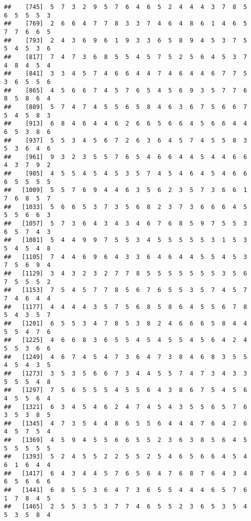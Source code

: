 \documentclass[
]{book}
\begin{document}
\begin{verbatim}
##    [745]  5  7  3  2  9  5  7  6  4  6  5  2  4  4  4  3  7  8  5  6  5  5  5  3
##    [769]  2  6  6  4  7  7  8  3  3  7  4  6  4  8  6  1  4  6  5  7  7  6  6  5
##    [793]  2  4  3  6  9  6  1  9  3  3  6  5  8  9  4  5  3  7  5  5  4  5  3  6
##    [817]  7  4  7  3  6  8  5  5  4  5  7  5  2  5  6  4  5  3  7  4  8  4  5  4
##    [841]  3  3  4  5  7  4  6  6  4  4  7  4  6  4  4  6  7  7  5  3  6  5  5  6
##    [865]  4  5  6  6  7  4  5  7  6  5  4  5  6  9  3  5  7  7  6  8  5  8  6  4
##    [889]  5  7  4  7  4  5  5  6  5  8  4  6  3  6  7  5  6  6  7  5  4  5  8  3
##    [913]  6  8  4  6  4  4  6  2  6  6  5  6  6  4  5  6  6  4  4  6  5  3  8  6
##    [937]  5  5  3  4  5  6  7  2  6  3  6  4  5  7  4  5  5  8  3  5  3  6  4  6
##    [961]  9  3  2  3  5  5  7  6  5  4  6  6  4  4  5  4  4  6  6  4  3  7  9  2
##    [985]  4  5  5  4  5  4  5  3  5  7  4  5  4  6  4  5  4  6  6  6  5  5  5  5
##   [1009]  5  5  7  6  9  4  4  6  3  5  6  2  3  5  7  3  6  6  1  7  6  8  5  7
##   [1033]  5  6  6  5  3  7  3  5  6  8  2  3  7  3  6  6  6  4  5  5  5  6  6  3
##   [1057]  5  7  3  6  4  3  4  3  4  6  7  6  8  5  9  7  5  5  3  6  5  7  4  3
##   [1081]  5  4  4  9  9  7  5  5  3  4  5  5  5  5  5  3  1  5  3  5  4  5  4  8
##   [1105]  7  4  4  6  9  6  4  3  3  6  4  6  4  4  5  5  4  5  3  7  5  6  9  4
##   [1129]  3  4  3  2  3  2  7  7  8  5  5  5  5  5  5  5  3  5  6  7  5  5  5  2
##   [1153]  7  5  4  5  7  7  8  5  6  7  6  5  5  3  5  7  4  5  7  7  4  6  4  4
##   [1177]  4  4  4  4  3  5  7  5  6  8  5  8  6  4  5  5  6  7  8  5  4  3  5  7
##   [1201]  6  5  5  3  4  7  8  5  3  8  2  4  6  6  6  5  8  4  4  5  5  4  7  6
##   [1225]  4  6  6  8  3  6  5  5  4  5  4  5  5  4  5  6  4  2  4  5  5  3  6  6
##   [1249]  4  6  7  4  5  4  7  3  6  4  7  3  8  4  6  8  3  5  5  4  5  4  3  5
##   [1273]  3  5  3  5  6  6  7  3  4  4  5  5  7  4  7  3  4  3  3  5  5  5  4  8
##   [1297]  7  5  6  5  5  5  4  5  5  6  4  3  8  6  7  5  4  5  6  4  5  5  6  4
##   [1321]  6  3  4  5  4  6  2  4  7  4  5  4  3  5  5  6  5  7  6  3  5  3  8  5
##   [1345]  4  7  3  5  4  4  8  6  5  5  6  4  4  4  7  6  4  2  6  4  5  7  5  4
##   [1369]  4  5  9  4  5  5  6  6  5  5  2  3  6  3  8  5  6  4  5  5  5  5  5  5
##   [1393]  5  2  4  5  5  2  2  5  5  2  5  4  6  5  6  6  4  5  4  6  1  6  4  4
##   [1417]  6  4  3  4  4  5  7  6  5  6  4  7  6  8  7  6  4  3  4  6  5  6  6  6
##   [1441]  6  8  5  5  3  6  4  7  3  6  5  5  4  4  4  6  5  7  6  1  7  8  4  5
##   [1465]  2  5  5  3  5  3  7  7  4  6  5  5  2  3  6  5  3  5  4  5  3  5  8  4

\end{verbatim}
\end{document}
